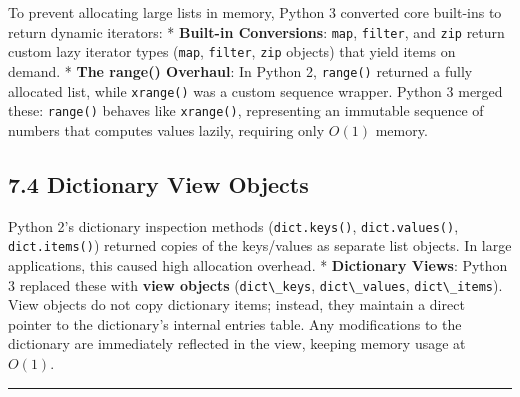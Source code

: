To prevent allocating large lists in memory, Python 3 converted core
built-ins to return dynamic iterators: * \textbf{Built-in Conversions}:
\passthrough{\lstinline!map!}, \passthrough{\lstinline!filter!}, and
\passthrough{\lstinline!zip!} return custom lazy iterator types
(\passthrough{\lstinline!map!}, \passthrough{\lstinline!filter!},
\passthrough{\lstinline!zip!} objects) that yield items on demand. *
\textbf{The range() Overhaul}: In Python 2,
\passthrough{\lstinline!range()!} returned a fully allocated list, while
\passthrough{\lstinline!xrange()!} was a custom sequence wrapper. Python
3 merged these: \passthrough{\lstinline!range()!} behaves like
\passthrough{\lstinline!xrange()!}, representing an immutable sequence
of numbers that computes values lazily, requiring only \(O(1)\) memory.

\hypertarget{dictionary-view-objects}{%
\subsection{7.4 Dictionary View Objects}\label{dictionary-view-objects}}

Python 2's dictionary inspection methods
(\passthrough{\lstinline!dict.keys()!},
\passthrough{\lstinline!dict.values()!},
\passthrough{\lstinline!dict.items()!}) returned copies of the
keys/values as separate list objects. In large applications, this caused
high allocation overhead. * \textbf{Dictionary Views}: Python 3 replaced
these with \textbf{view objects} (\passthrough{\lstinline!dict\_keys!},
\passthrough{\lstinline!dict\_values!},
\passthrough{\lstinline!dict\_items!}). View objects do not copy
dictionary items; instead, they maintain a direct pointer to the
dictionary's internal entries table. Any modifications to the dictionary
are immediately reflected in the view, keeping memory usage at \(O(1)\).

\begin{center}\rule{0.5\linewidth}{0.5pt}\end{center}
